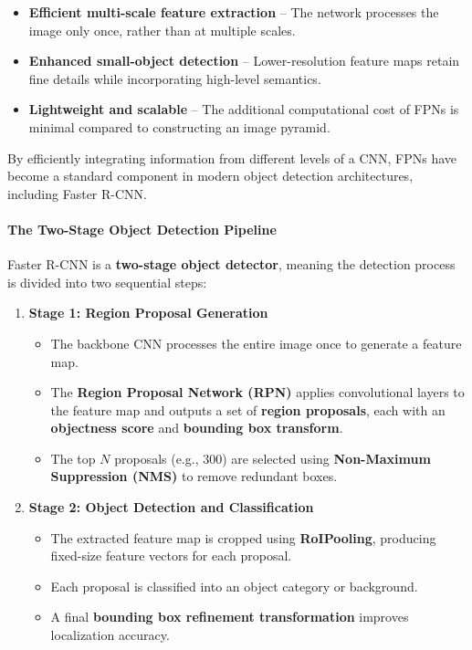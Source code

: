 \begin{itemize}
    \item \textbf{Efficient multi-scale feature extraction} – The network processes the image only once, rather than at multiple scales.
    \item \textbf{Enhanced small-object detection} – Lower-resolution feature maps retain fine details while incorporating high-level semantics.
    \item \textbf{Lightweight and scalable} – The additional computational cost of FPNs is minimal compared to constructing an image pyramid.
\end{itemize}

By efficiently integrating information from different levels of a CNN, FPNs have become a standard component in modern object detection architectures, including Faster R-CNN.

\newpage

\paragraph{\textbf{The Two-Stage Object Detection Pipeline}}  
Faster R-CNN is a \textbf{two-stage object detector}, meaning the detection process is divided into two sequential steps:

\begin{enumerate}
    \item \textbf{Stage 1: Region Proposal Generation}
    \begin{itemize}
        \item The backbone CNN processes the entire image once to generate a feature map.
        \item The \textbf{Region Proposal Network (RPN)} applies convolutional layers to the feature map and outputs a set of \textbf{region proposals}, each with an \textbf{objectness score} and \textbf{bounding box transform}.
        \item The top $N$ proposals (e.g., 300) are selected using \textbf{Non-Maximum Suppression (NMS)} to remove redundant boxes.
    \end{itemize}
    
    \item \textbf{Stage 2: Object Detection and Classification}
    \begin{itemize}
        \item The extracted feature map is cropped using \textbf{RoIPooling}, producing fixed-size feature vectors for each proposal.
        \item Each proposal is classified into an object category or background.
        \item A final \textbf{bounding box refinement transformation} improves localization accuracy.
    \end{itemize}
\end{enumerate}

